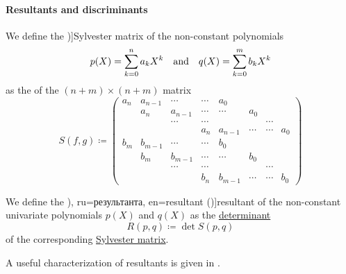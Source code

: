\paragraph{Resultants and discriminants}

\begin{definition}\label{def:sylvester_matrix}
  We define the \term[ru=матрица Сильвестра, en=Sylvester matrix (\cite[def. 3.6.2]{CoxLittleOShea2015AlgGeometry})]{Sylvester matrix} of the non-constant polynomials
  \begin{align*}
    p(X) = \sum_{k=0}^n a_k X^k
    &&\T{and}&&
    q(X) = \sum_{k=0}^m b_k X^k
  \end{align*}
  as the  of the \( (n + m) \times (n + m) \) matrix
  \begin{equation*}
    S(f, g) \coloneqq
    \begin{pmatrix}
      a_n    & a_{n-1} & \cdots  & \cdots  & a_0     &        &        &        \\
             & a_n     & a_{n-1} & \cdots  & \cdots  & a_0    &        &        \\
             &         & \cdots  & \cdots  &         &        & \cdots &        \\
             &         &         & a_n     & a_{n-1} & \cdots & \cdots & a_0    \\
      b_m    & b_{m-1} & \cdots  & \cdots  & b_0     &        &        &        \\
             & b_m     & b_{m-1} & \cdots  & \cdots  & b_0    &        &        \\
             &         & \cdots  & \cdots  &         &        & \cdots &        \\
             &         &         & b_n     & b_{m-1} & \cdots & \cdots & b_0
    \end{pmatrix}
  \end{equation*}
\end{definition}

\begin{definition}\label{def:resultant}
  We define the \term[bg=резултанта (\cite[198]{Обрешков1962ВисшаАлгебра}), ru=результанта, en=resultant (\cite[def. 3.6.2]{CoxLittleOShea2015AlgGeometry})]{resultant} of the non-constant univariate polynomials \( p(X) \) and \( q(X) \) as the \hyperref[def:matrix_determinant]{determinant}
  \begin{equation*}
    R(p, q) \coloneqq \det S(p, q)
  \end{equation*}
  of the corresponding \hyperref[def:sylvester_matrix]{Sylvester matrix}.
\end{definition}
\begin{comments}
  \item A useful characterization of resultants is given in .
\end{comments}

